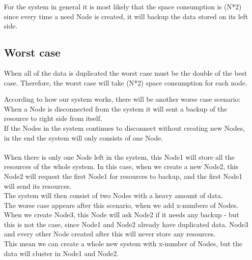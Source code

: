 For the system in general it is most likely that the space consumption is (N*2) since every time a need Node is created, it will backup the data stored on its left side. 

\subsection{Worst case}
When all of the data is duplicated the worst case must be the double of the best case. Therefore, the worst case will take (N*2) space consumption for each node. \\


According to how our system works, there will be another worse case scenario: \\
When a Node is disconnected from the system it will sent a backup of the resource to right side from itself. \\
If the Nodes in the system continues to disconnect without creating new Nodes, in the end the system will only consists of one Node. \\\\
When there is only one Node left in the system, this Node1 will store all the resources of the whole system. In this case, when we create a new Node2, this Node2 will request the first Node1 for resources to backup, and the first Node1 will send its resources. \\ The system will then consist of two Nodes with a heavy amount of data.\\
The worse case appears after this scenario, when we add x-numbers of Nodes. \\
When we create Node3, this Node will ask Node2 if it needs any backup - but this is not the case, since Node1 and Node2 already have duplicated data. Node3 and every other Node created after this will never store any resources.\\
This mean we can create a whole new system with x-number of Nodes, but the data will cluster in Node1 and Node2. 
